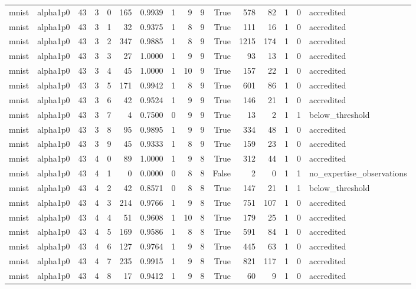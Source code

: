 \begin{tabular}{llrrrrrrrrrrrrrl}
mnist & alpha1p0 & 43 & 3 & 0 & 165 & 0.9939 & 1 & 9 & 9 & True & 578 & 82 & 1 & 0 & accredited \\
mnist & alpha1p0 & 43 & 3 & 1 & 32 & 0.9375 & 1 & 8 & 9 & True & 111 & 16 & 1 & 0 & accredited \\
mnist & alpha1p0 & 43 & 3 & 2 & 347 & 0.9885 & 1 & 8 & 9 & True & 1215 & 174 & 1 & 0 & accredited \\
mnist & alpha1p0 & 43 & 3 & 3 & 27 & 1.0000 & 1 & 9 & 9 & True & 93 & 13 & 1 & 0 & accredited \\
mnist & alpha1p0 & 43 & 3 & 4 & 45 & 1.0000 & 1 & 10 & 9 & True & 157 & 22 & 1 & 0 & accredited \\
mnist & alpha1p0 & 43 & 3 & 5 & 171 & 0.9942 & 1 & 8 & 9 & True & 601 & 86 & 1 & 0 & accredited \\
mnist & alpha1p0 & 43 & 3 & 6 & 42 & 0.9524 & 1 & 9 & 9 & True & 146 & 21 & 1 & 0 & accredited \\
mnist & alpha1p0 & 43 & 3 & 7 & 4 & 0.7500 & 0 & 9 & 9 & True & 13 & 2 & 1 & 1 & below\_threshold \\
mnist & alpha1p0 & 43 & 3 & 8 & 95 & 0.9895 & 1 & 9 & 9 & True & 334 & 48 & 1 & 0 & accredited \\
mnist & alpha1p0 & 43 & 3 & 9 & 45 & 0.9333 & 1 & 8 & 9 & True & 159 & 23 & 1 & 0 & accredited \\
mnist & alpha1p0 & 43 & 4 & 0 & 89 & 1.0000 & 1 & 9 & 8 & True & 312 & 44 & 1 & 0 & accredited \\
mnist & alpha1p0 & 43 & 4 & 1 & 0 & 0.0000 & 0 & 8 & 8 & False & 2 & 0 & 1 & 1 & no\_expertise\_observations \\
mnist & alpha1p0 & 43 & 4 & 2 & 42 & 0.8571 & 0 & 8 & 8 & True & 147 & 21 & 1 & 1 & below\_threshold \\
mnist & alpha1p0 & 43 & 4 & 3 & 214 & 0.9766 & 1 & 9 & 8 & True & 751 & 107 & 1 & 0 & accredited \\
mnist & alpha1p0 & 43 & 4 & 4 & 51 & 0.9608 & 1 & 10 & 8 & True & 179 & 25 & 1 & 0 & accredited \\
mnist & alpha1p0 & 43 & 4 & 5 & 169 & 0.9586 & 1 & 8 & 8 & True & 591 & 84 & 1 & 0 & accredited \\
mnist & alpha1p0 & 43 & 4 & 6 & 127 & 0.9764 & 1 & 9 & 8 & True & 445 & 63 & 1 & 0 & accredited \\
mnist & alpha1p0 & 43 & 4 & 7 & 235 & 0.9915 & 1 & 9 & 8 & True & 821 & 117 & 1 & 0 & accredited \\
mnist & alpha1p0 & 43 & 4 & 8 & 17 & 0.9412 & 1 & 9 & 8 & True & 60 & 9 & 1 & 0 & accredited \\

\end{tabular}
